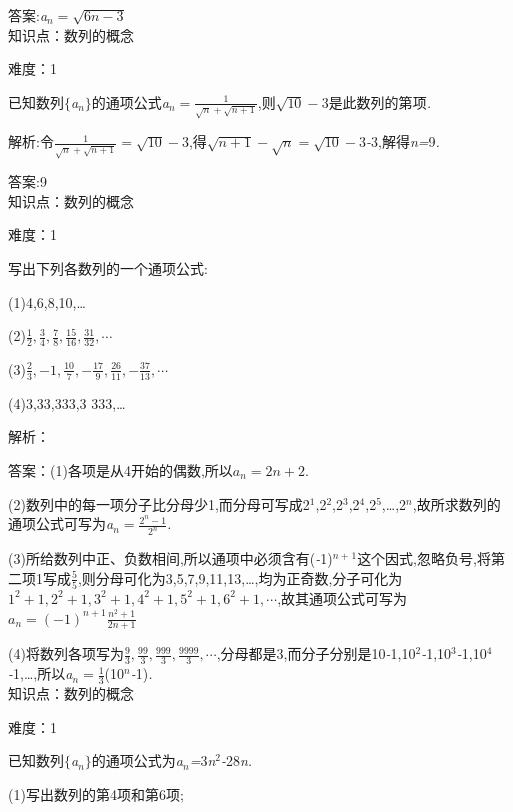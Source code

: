 \documentclass{article} %
\begin{document}
 答案:\textit{a${}_{n}=\sqrt{6n-3}$} \\

知识点：数列的概念

难度：1
  
已知数列$\mathrm{\{}$\textit{a${}_{n}$}$\mathrm{\}}$的通项公式\textit{a${}_{n}=\frac{1}{\sqrt{n}+\sqrt{n+1}}$},则$\sqrt{10}-3$是此数列的第\textit{\underbar{　　　　　}}项\textit{.~}

 解析:令$\frac{1}{\sqrt{n}+\sqrt{n+1}}=\sqrt{10}-3$,得$\sqrt{n+1}-\sqrt{n}=\sqrt{10}-3$\textit{-}3,解得\textit{n=}9\textit{.}

 答案:9 \\

知识点：数列的概念

难度：1

写出下列各数列的一个通项公式:

 (1)4,6,8,10,{\dots}

 (2)$\frac{1}{2},\frac{3}{4},\frac{7}{8},\frac{15}{16},\frac{31}{32},\cdots$

 (3)$\frac{2}{3},-1,\frac{10}{7},-\frac{17}{9},\frac{26}{11},-\frac{37}{13},\cdots$

 (4)3,33,333,3 333,{\dots}

解析：

 答案：(1)各项是从4开始的偶数,所以$a_n=2n+2$.

(2)数列中的每一项分子比分母少1,而分母可写成2${}^{1}$,2${}^{2}$,2${}^{3}$,2${}^{4}$,2${}^{5}$,{\dots},2\textit{${}^{n}$},故所求数列的通项公式可写为\textit{a${}_{n}=\frac{2^n-1}{2^n}$}\textit{.}

(3)所给数列中正、负数相间,所以通项中必须含有(\textit{-}1)\textit{${}^{n+}$}${}^{1}$这个因式,忽略负号,将第二项1写成$\frac{5}{5}$,则分母可化为3,5,7,9,11,13,{\dots},均为正奇数,分子可化为$1^2+1,2^2+1,3^2+1,4^2+1,5^2+1,6^2+1,\cdots$,故其通项公式可写为$a_n=(-1)^{n+1}\frac{n^2+1}{2n+1}$

(4)将数列各项写为$\frac{9}{3},\frac{99}{3},\frac{999}{3},\frac{9999}{3},\cdots$,分母都是3,而分子分别是10\textit{-}1,10${}^{2}$\textit{-}1,10${}^{3}$\textit{-}1,10${}^{4}$\textit{-}1,{\dots},所以\textit{a${}_{n}=\frac{1}{3}$}(10\textit{${}^{n}$-}1)\textit{.} \\

知识点：数列的概念

难度：1
 
已知数列$\mathrm{\{}$\textit{a${}_{n}$}$\mathrm{\}}$的通项公式为\textit{a${}_{n}$=}3\textit{n}${}^{2}$\textit{-}28\textit{n.}

 (1)写出数列的第4项和第6项;
\end{document}
